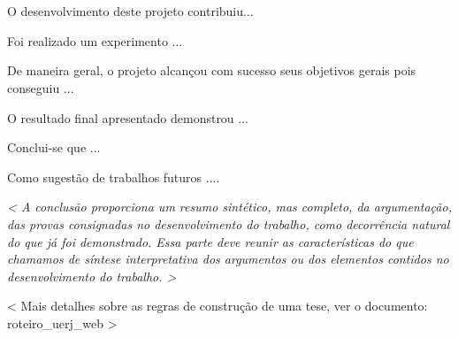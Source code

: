 \chapter*{}
\noindent
{}
\newline
\newline


O desenvolvimento deste projeto contribuiu...

Foi realizado um experimento ...

De maneira geral, o projeto alcançou com sucesso seus objetivos gerais pois conseguiu  ...

O resultado final apresentado demonstrou ...

Conclui-se que ...

Como sugestão de trabalhos futuros ....

\vspace{0.5cm}
\textit{< A conclusão proporciona um resumo sintético, mas completo, da
argumentação, das provas consignadas no desenvolvimento do trabalho,
como decorrência natural do que já foi demonstrado. Essa parte deve reunir as características do que chamamos de síntese interpretativa dos
argumentos ou dos elementos contidos no desenvolvimento do trabalho.
>}

< Mais detalhes sobre as regras de construção de uma tese, ver o documento: roteiro\_uerj\_web >
